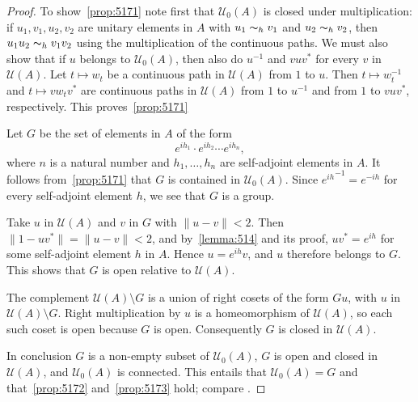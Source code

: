 \documentclass{book}
\begin{document}
\begin{proof}
  To show~\ref{prop:5171} note first that \(\mathcal{U}_0(A)\) is closed under multiplication:
  if \(u_1,v_1,u_2,v_2\) are unitary elements in \(A\) with \(u_1\thicksim_h v_1\) and \(u_2\thicksim_h v_2\),
  then \(u_1 u_2\thicksim_h v_1 v_2\) using the multiplication of the continuous paths.
  We must also show that if \(u\) belongs to \(\mathcal{U}_0(A)\), then also do \(u^{-1}\) 
  and \(vuv^*\) for every \(v\) in \(\mathcal{U}(A)\). Let \(t\mapsto w_t\) be a continuous path in \(\mathcal{U}(A)\)
  from \(1\) to \(u\). Then \(t \mapsto w_t^{-1}\) and \(t\mapsto v w_t v^*\) are continuous paths in \(\mathcal{U}(A)\)
  from \(1\) to \(u^{-1}\) and from \(1\) to \(vu v^*\), respectively. This proves~\ref{prop:5171}\par
  Let \(G\) be the set of elements in \(A\) of the form
  \[
    e^{ih_1}\cdot e^{ih_2}\cdots e^{ih_n},
  \]
  where \(n\) is a natural number and \(h_1,\ldots,h_n\) are self-adjoint elements in \(A\).
  It follows from~\ref{prop:5171} that \(G\) is contained in \(\mathcal{U}_0(A)\).
  Since \({e^{ih}}^{-1}=e^{-ih}\) for every self-adjoint element \(h\), we see that \(G\)
  is a group.\par
  Take \(u\) in \(\mathcal{U}(A)\) and \(v\) in \(G\) with \(\|u-v\|<2\). Then \(\|1-uv^*\|=\|u-v\|<2\), 
  and by~\ref{lemma:514} and its proof, \(u v^*=e^{ih}\) for some self-adjoint element \(h\) in \(A\).
  Hence \(u=e^{ih}v\), and \(u\) therefore belongs to \(G\). This shows that \(G\) is open relative to \(\mathcal{U}(A)\).\par
  The complement \(\mathcal{U}(A)\setminus G\) is a union of right cosets of the form \(Gu\), with
  \(u\) in \(\mathcal{U}(A)\setminus G\). Right multiplication by \(u\) is a homeomorphism of
  \(\mathcal{U}(A)\), so each such coset is open because \(G\) is open.
  Consequently \(G\) is closed in \(\mathcal{U}(A)\).\par
  In conclusion \(G\) is a non-empty subset of \(\mathcal{U}_0(A)\), \(G\) is open and closed in \(\mathcal{U}(A)\),
  and \(\mathcal{U}_0(A)\) is connected. This entails that \(\mathcal{U}_0(A) = G\) and that~\ref{prop:5172} and~\ref{prop:5173} hold;
  compare \cite[Proposition~2.1.6]{RordamLarsenLaustsen2000}.
\end{proof}
\end{document}
